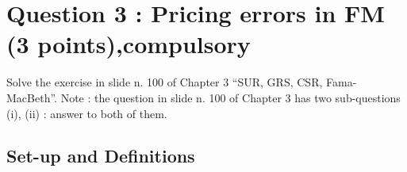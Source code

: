 \documentclass[]{article}
\title{}
\author{}
\begin{document}
\maketitle

\section*{Question 3 : Pricing errors in FM (3 points),compulsory}
Solve the exercise in slide n. 100 of Chapter 3 “SUR, GRS, CSR, Fama-MacBeth”. Note : the question in slide n. 100 of Chapter 3 has two sub-questions (i), (ii) : answer to both of them.\\

\subsection*{Set-up and Definitions}
\end{document}
